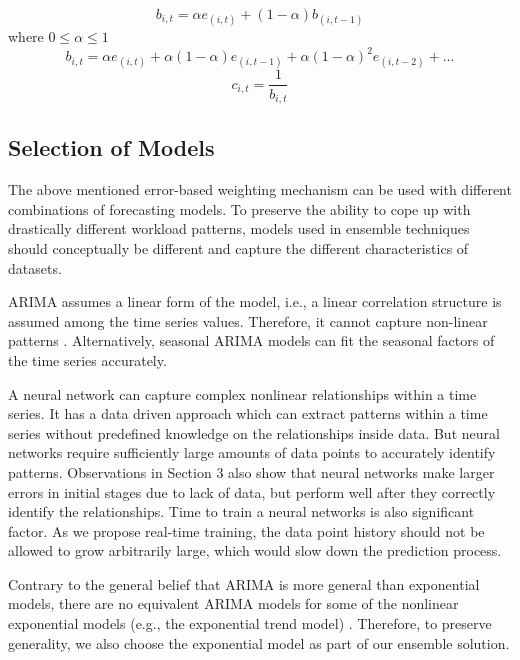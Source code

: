 \begin{equation} \label{eq:1}
b_{i,t}= \alpha e_{(i,t)} + (1-\alpha)b_{(i,t-1)}
\end{equation}
where $0\leq \alpha \leq 1$
\begin{equation}\nonumber
b_{i,t}=\alpha e_{(i,t)} + \alpha(1-\alpha)e_{(i,t-1)}+\alpha(1-\alpha)^2e_{(i,t-2)}+ . ..  
\end{equation}
\begin{equation}
c_{i,t}=\frac{1}{b_{i,t}} 
\end{equation}

\subsection{Selection of Models}
The above mentioned error-based weighting mechanism can be used with different combinations of forecasting models. To preserve the ability to cope up with drastically different workload patterns, models used in ensemble techniques should conceptually be different and capture the different characteristics of datasets.

ARIMA assumes a linear form of the model, i.e., a linear correlation structure is assumed among the time series values. Therefore, it cannot capture non-linear patterns \cite{Zhang_2003}. Alternatively, seasonal ARIMA models can fit the seasonal factors of the time series accurately.

A neural network can capture complex nonlinear relationships within a time series. It has a data driven approach which can extract patterns within a time series without predefined knowledge on the relationships inside data. But neural networks require sufficiently large amounts of data points to accurately identify patterns. Observations in Section 3 also show that neural networks make larger errors in initial stages due to lack of data, but perform well after they correctly identify the relationships. Time to train a neural networks is also significant factor. As we propose real-time training, the data point history should not be allowed to grow arbitrarily large, which would slow down the prediction process.

Contrary to the general belief that ARIMA is more general than exponential models, there are no equivalent ARIMA models for some of the nonlinear exponential models (e.g., the exponential trend model) \cite{Forecasting_OTexts}. Therefore, to preserve generality, we also choose the exponential model as part of our ensemble solution.

